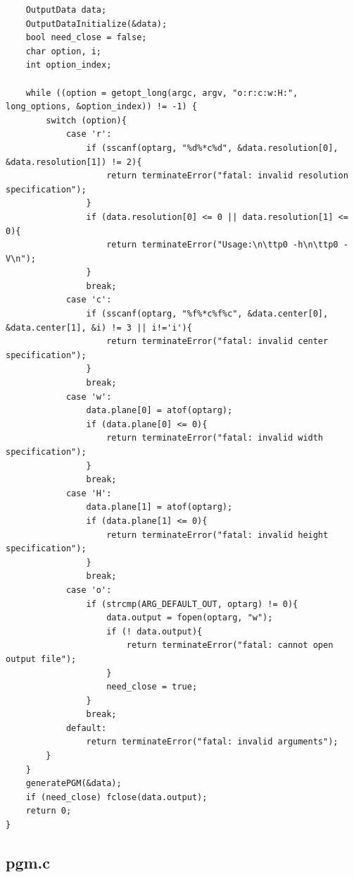 \documentclass[a4paper,10pt]{article}
\begin{document}
\begin{verbatim}
    OutputData data;
    OutputDataInitialize(&data);
    bool need_close = false;
    char option, i;
    int option_index;

    while ((option = getopt_long(argc, argv, "o:r:c:w:H:", long_options, &option_index)) != -1) {
        switch (option){
            case 'r':
                if (sscanf(optarg, "%d%*c%d", &data.resolution[0], &data.resolution[1]) != 2){
                    return terminateError("fatal: invalid resolution specification");
                }
                if (data.resolution[0] <= 0 || data.resolution[1] <= 0){
                    return terminateError("Usage:\n\ttp0 -h\n\ttp0 -V\n");
                }
                break;
            case 'c':
                if (sscanf(optarg, "%f%*c%f%c", &data.center[0], &data.center[1], &i) != 3 || i!='i'){
                    return terminateError("fatal: invalid center specification");
                }
                break;
            case 'w':
                data.plane[0] = atof(optarg);
                if (data.plane[0] <= 0){
                    return terminateError("fatal: invalid width specification");
                }
                break;
            case 'H':
                data.plane[1] = atof(optarg);
                if (data.plane[1] <= 0){
                    return terminateError("fatal: invalid height specification");
                }
                break;
            case 'o':
                if (strcmp(ARG_DEFAULT_OUT, optarg) != 0){
                    data.output = fopen(optarg, "w");
                    if (! data.output){
                        return terminateError("fatal: cannot open output file");
                    }
                    need_close = true;
                }
                break;
            default:
                return terminateError("fatal: invalid arguments");
        }
    }
    generatePGM(&data);
    if (need_close) fclose(data.output);
    return 0;
}

\end{verbatim}
\pagebreak

\subsection{pgm.c}
\end{document}
